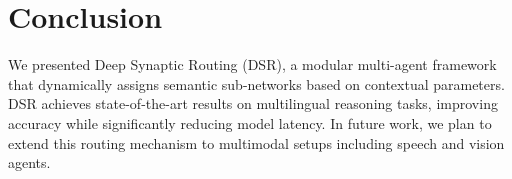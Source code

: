 \section{Conclusion}
\label{sec:conclusion}
We presented Deep Synaptic Routing (DSR), a modular multi-agent framework that dynamically assigns semantic sub-networks based on contextual parameters. DSR achieves state-of-the-art results on multilingual reasoning tasks, improving accuracy while significantly reducing model latency. In future work, we plan to extend this routing mechanism to multimodal setups including speech and vision agents.



